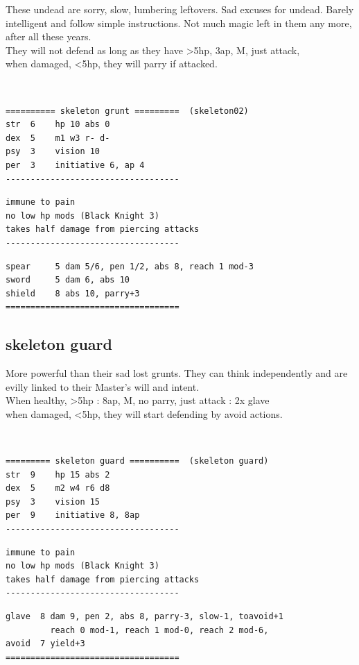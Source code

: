 These undead are sorry, slow, lumbering leftovers. Sad excuses for undead. Barely intelligent and follow simple instructions. Not much magic left in them any more, after all these years.\\
They will not defend as long as they have >5hp, 3ap, M, just attack,\\
when damaged, <5hp, they will parry if attacked.

\

\small \begin{samepage} \begin{verbatim}
========== skeleton grunt =========  (skeleton02)
str  6    hp 10 abs 0
dex  5    m1 w3 r- d-
psy  3    vision 10
per  3    initiative 6, ap 4
-----------------------------------
\end{verbatim} \goodbreak \begin{verbatim}
immune to pain
no low hp mods (Black Knight 3)
takes half damage from piercing attacks
-----------------------------------
\end{verbatim} \goodbreak \begin{verbatim}
spear     5 dam 5/6, pen 1/2, abs 8, reach 1 mod-3
sword     5 dam 6, abs 10
shield    8 abs 10, parry+3
===================================
\end{verbatim} \end{samepage} \normalsize


\goodbreak 
\subsection*{skeleton guard}
\label{skeletonguard}

More powerful than their sad lost grunts. They can think independently and are evilly linked to their Master's will and intent.\\
When healthy, >5hp : 8ap, M, no parry, just attack : 2x glave\\
when damaged, <5hp, they will start defending by avoid actions.

\

\small \begin{samepage} \begin{verbatim}
========= skeleton guard ==========  (skeleton guard)
str  9    hp 15 abs 2
dex  5    m2 w4 r6 d8
psy  3    vision 15
per  9    initiative 8, 8ap
-----------------------------------
\end{verbatim} \goodbreak \begin{verbatim}
immune to pain
no low hp mods (Black Knight 3)
takes half damage from piercing attacks
-----------------------------------
\end{verbatim} \goodbreak \begin{verbatim}
glave  8 dam 9, pen 2, abs 8, parry-3, slow-1, toavoid+1
         reach 0 mod-1, reach 1 mod-0, reach 2 mod-6,
avoid  7 yield+3
===================================
\end{verbatim} \end{samepage} \normalsize


